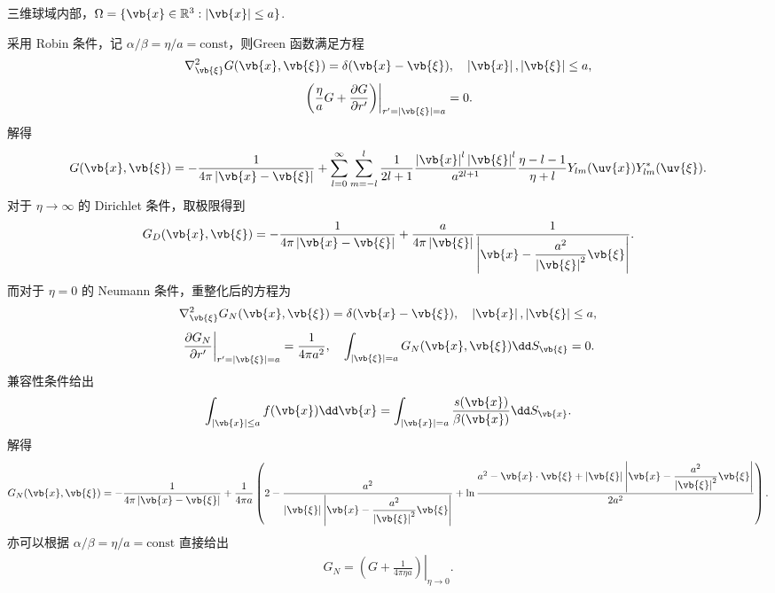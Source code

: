 \begin{exbox}
	三维球域内部，\(\Omega=\{\vb{x}\in\mathbb{R}^3:\left|\vb{x}\right|\leq a\}\).
	
	采用 Robin 条件，记 \(\alpha/\beta=\eta/a=\mathrm{const}\)，则Green 函数满足方程
	\begin{align*}
		\nabla_{\vb{\xi}}^2G(\vb{x},\vb{\xi})=\delta(\vb{x}-\vb{\xi}),\quad
		\left|\vb{x}\right|,\left|\vb{\xi}\right|\leq a,
	\end{align*}
	\begin{align*}
		\left.\left(\frac{\eta}{a}G+\frac{\partial G}{\partial r'}\right)\right|_{r'=\left|\vb{\xi}\right|=a}=0.
	\end{align*}
	解得
	\begin{align*}
		G(\vb{x},\vb{\xi})
		=-\frac{1}{4\pi\left|\vb{x}-\vb{\xi}\right|}
		+\sum_{l=0}^\infty\sum_{m=-l}^l\frac{1}{2l+1}\frac{\left|\vb{x}\right|^l\left|\vb{\xi}\right|^l}{a^{2l+1}}\frac{\eta-l-1}{\eta+l}Y_{lm}(\uv{x})Y_{lm}^*(\uv{\xi}).
	\end{align*}
	对于 \(\eta\to\infty\) 的 Dirichlet 条件，取极限得到
	\begin{align*}
		G_D(\vb{x},\vb{\xi})
		=-\frac{1}{4\pi\left|\vb{x}-\vb{\xi}\right|}
		+\frac{a}{4\pi\left|\vb{\xi}\right|}\frac{1}{\left|\vb{x}-\dfrac{a^2}{\left|\vb{\xi}\right|^2}\vb{\xi}\right|}.
	\end{align*}
	而对于 \(\eta=0\) 的 Neumann 条件，重整化后的方程为
	\begin{align*}
		\nabla_{\vb{\xi}}^2G_N(\vb{x},\vb{\xi})=\delta(\vb{x}-\vb{\xi}),\quad
		\left|\vb{x}\right|,\left|\vb{\xi}\right|\leq a,
	\end{align*}
	\begin{align*}
		\left.\frac{\partial G_N}{\partial r'}\right|_{r'=\left|\vb{\xi}\right|=a}=\frac{1}{4\pi a^2},\quad
		\int_{\left|\vb{\xi}\right|=a}G_N(\vb{x},\vb{\xi})\dd S_{\vb{\xi}}=0.
	\end{align*}
	兼容性条件给出
	\begin{align*}
		\int_{\left|\vb{x}\right|\leq a}f(\vb{x})\dd\vb{x}
		=\int_{\left|\vb{x}\right|=a}\frac{s(\vb{x})}{\beta(\vb{x})}\dd S_{\vb{x}}.
	\end{align*}
	解得
	\begin{align*}
		G_N(\vb{x},\vb{\xi})
		=-\frac{1}{4\pi\left|\vb{x}-\vb{\xi}\right|}
		+\frac{1}{4\pi a}\left(2-\frac{a^2}{\left|\vb{\xi}\right|\left|\vb{x}-\dfrac{a^2}{\left|\vb{\xi}\right|^2}\vb{\xi}\right|}
		+\ln\frac{a^2-\vb{x}\cdot\vb{\xi}+\left|\vb{\xi}\right|\left|\vb{x}-\dfrac{a^2}{\left|\vb{\xi}\right|^2}\vb{\xi}\right|}{2a^2}\right).
	\end{align*}
	亦可以根据 \(\alpha/\beta=\eta/a=\mathrm{const}\) 直接给出
	\begin{align*}
		G_N=\left.\left(G+\frac{1}{4\pi\eta a}\right)\right|_{\eta\to0}.
	\end{align*}
\end{exbox}

